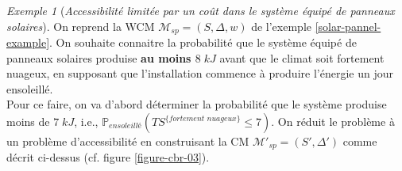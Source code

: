 \documentclass[12pt,a4paper]{report}
\theoremstyle{definition}%
\theoremstyle{remark}
\newtheorem{example}{Exemple}[chapter]
\newcommand{\ie}{i.e., }
\newcommand{\cf}{cf. }
\newcommand{\pr}{\mathbb{P}}
\begin{document}
\begin{example}[\textit{Accessibilité limitée par un coût dans le système équipé de panneaux solaires}]
	On reprend la WCM $\mathcal{M}_{sp} = (S, \Delta, w)$ de l'exemple \ref{solar-pannel-example}. 
	On souhaite connaitre la probabilité que le système équipé de panneaux solaires produise \textbf{au moins $8 \; kJ$} avant que le climat soit fortement nuageux, en supposant que l'installation commence à produire l'énergie un jour ensoleillé.\\
	Pour ce faire, on va d'abord déterminer la probabilité que le système produise moins de $7\; kJ$, \ie $\pr_{\textit{ensoleillé}}(TS^{\{ \textit{fortement nuageux} \}} \leq 7)$. On réduit le problème à un problème d'accessibilité en construisant la CM $\mathcal{M'}_{sp} = (S', \Delta')$ comme décrit ci-dessus (\cf figure \ref{figure-cbr-03}).
	

\end{example}
\end{document}

